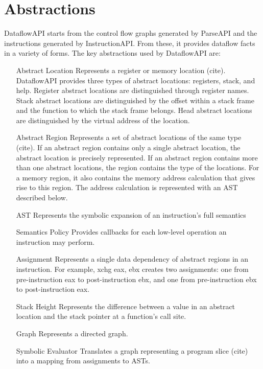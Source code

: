 \section{Abstractions}
\label{sec:abstractions}

DataflowAPI starts from the control flow graphs generated by ParseAPI and the instructions generated by InstructionAPI.
From these, it provides dataflow facts in a variety of forms. The key abstractions used by DataflowAPI are:

\begin{itemize}
\item[Abstract Location] Represents a register or memory location (cite).
DataflowAPI provides three types of abstract locations: registers, stack, and
help. Register abstract locations are distinguished through register names.
Stack abstract locations are distinguished by the offset within a stack frame
and the function to which the stack frame belongs.
Head abstract locations are distinguished by the virtual address of the
location.
\item[Abstract Region] Represents a set of abstract locations of the same type
(cite). If an abstract region contains only a single abstract location, the
abstract location is precisely represented. 
If an abstract region contains more than one abstract locations, the region
contains the type of the locations. For a memory region, it also contains 
the memory address calculation that gives rise to this region. The address
calculation is represented with an AST described below.
\item[AST] Represents the symbolic expansion of an instruction's full semantics
\item[Semantics Policy] Provides callbacks for each low-level operation an instruction may perform.
\item[Assignment] Represents a single data dependency of abstract regions in an instruction. For example, xchg eax, ebx creates two assignments: one from pre-instruction eax to post-instruction ebx, and one from pre-instruction ebx to post-instruction eax.
\item[Stack Height] Represents the difference between a value in an abstract location and the stack pointer at a function's call site.
\item[Graph] Represents a directed graph.
\item[Symbolic Evaluator] Translates a graph representing a program slice (cite) into a mapping from assignments to ASTs.
\end{itemize}


